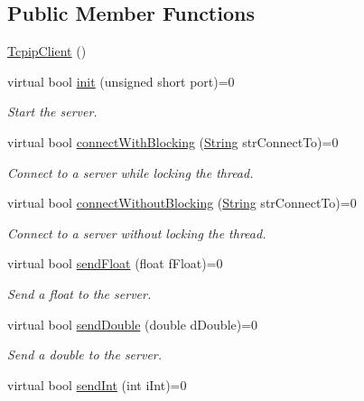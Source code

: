 \subsection*{Public Member Functions}
\begin{DoxyCompactItemize}
\item 
\hyperlink{class_rad_j_a_v_1_1_networking_1_1_tcpip_client_aae23fc057bdef796ad8536ddfe9d23f2}{Tcpip\+Client} ()
\item 
virtual bool \hyperlink{class_rad_j_a_v_1_1_networking_1_1_tcpip_client_aba21f2a319d4268bdf04525b1e35ccab}{init} (unsigned short port)=0
\begin{DoxyCompactList}\small\item\em Start the server. \end{DoxyCompactList}\item 
virtual bool \hyperlink{class_rad_j_a_v_1_1_networking_1_1_tcpip_client_ade2497881107c14dd0b3a32ff1f6f669}{connect\+With\+Blocking} (\hyperlink{class_rad_j_a_v_1_1_string}{String} str\+Connect\+To)=0
\begin{DoxyCompactList}\small\item\em Connect to a server while locking the thread. \end{DoxyCompactList}\item 
virtual bool \hyperlink{class_rad_j_a_v_1_1_networking_1_1_tcpip_client_a2125d436db16091fe9c60ed30b34c56e}{connect\+Without\+Blocking} (\hyperlink{class_rad_j_a_v_1_1_string}{String} str\+Connect\+To)=0
\begin{DoxyCompactList}\small\item\em Connect to a server without locking the thread. \end{DoxyCompactList}\item 
virtual bool \hyperlink{class_rad_j_a_v_1_1_networking_1_1_tcpip_client_a0b8da5667dd8c42e8fb358e35b4c8f96}{send\+Float} (float f\+Float)=0
\begin{DoxyCompactList}\small\item\em Send a float to the server. \end{DoxyCompactList}\item 
virtual bool \hyperlink{class_rad_j_a_v_1_1_networking_1_1_tcpip_client_a5f058b50cc9da6de81da6b9f02f2ca24}{send\+Double} (double d\+Double)=0
\begin{DoxyCompactList}\small\item\em Send a double to the server. \end{DoxyCompactList}\item 
virtual bool \hyperlink{class_rad_j_a_v_1_1_networking_1_1_tcpip_client_a55e9334efa84818084a55b8121faaf2f}{send\+Int} (int i\+Int)=0

\end{DoxyCompactItemize}
